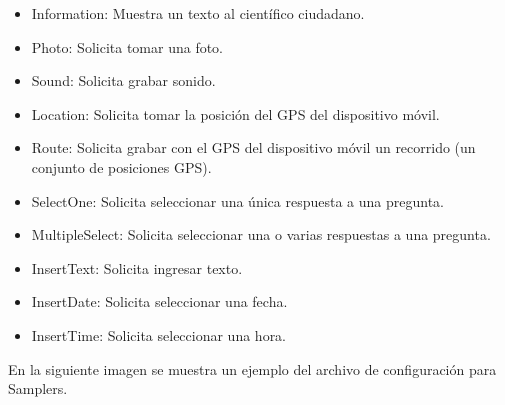 \begin{itemize}

\item Information: Muestra un texto al científico ciudadano.

\item Photo: Solicita tomar una foto.

\item Sound: Solicita grabar sonido.

\item Location: Solicita tomar la posición del GPS del dispositivo móvil.

\item Route: Solicita grabar con el GPS del dispositivo móvil un recorrido (un conjunto de posiciones GPS).

\item SelectOne: Solicita seleccionar una única respuesta a una pregunta.

\item MultipleSelect: Solicita seleccionar una o varias respuestas a una pregunta.

\item InsertText: Solicita ingresar texto.

\item InsertDate: Solicita seleccionar una fecha.

\item InsertTime: Solicita seleccionar una hora.

\end{itemize}

En la siguiente imagen se muestra un ejemplo del archivo de configuración para Samplers.


